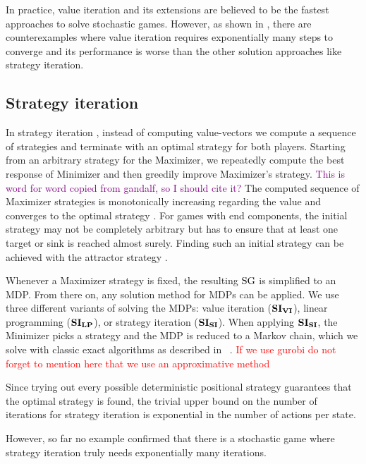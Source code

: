 In practice, value iteration and its extensions are believed to be the fastest approaches to solve stochastic games.
However, as shown in \cite{viExponential}, there are counterexamples where value iteration requires exponentially many steps to converge and its performance is worse than the other solution approaches like strategy iteration.

\subsection{Strategy iteration}
In strategy iteration \cite{HoffmanKarp}\cite{condonQP}, instead of computing value-vectors we compute a sequence of strategies and terminate with an optimal strategy for both players.
Starting from an arbitrary strategy for the Maximizer, we repeatedly compute the best response of Minimizer and then greedily improve Maximizer's strategy. 
\textcolor{purple}{This is word for word copied from gandalf, so I should cite it?}
The computed sequence of Maximizer strategies is monotonically increasing regarding the value and converges to the optimal strategy \cite[Theorem3]{correctnessSI}.
For games with end components, the initial strategy may not be completely arbitrary but has to ensure that at least one target or sink is reached almost surely.
Finding such an initial strategy can be achieved with the attractor strategy \cite[Section 5.3]{correctnessSI}.

Whenever a Maximizer strategy is fixed, the resulting $\textrm{SG}$ is simplified to an MDP. 
From there on, any solution method for MDPs can be applied.
We use three different variants of solving the MDPs: value iteration ($\mathbf{SI_{VI}}$), linear programming \cite{Puterman} ($\mathbf{SI_{LP}}$),
or strategy iteration ($\mathbf{SI_{SI}}$). When applying $\mathbf{SI_{SI}}$, the Minimizer picks a strategy and the MDP is reduced to a Markov chain, 
which we solve with classic exact algorithms as described in ~\cite[Chapter 11]{introProb}. \textcolor{red}{If we use gurobi do not forget to mention here that we use an approximative method}

Since trying out every possible deterministic positional strategy guarantees that the optimal strategy is found,
the trivial upper bound on the number of iterations for strategy iteration is exponential in the number of actions per state.

However, so far no example confirmed that there is a stochastic game where strategy iteration truly needs exponentially many iterations.

